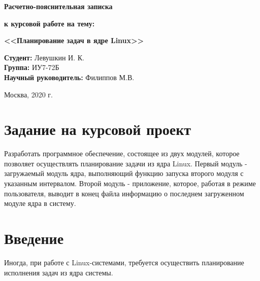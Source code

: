 \documentclass[a4paper,14pt]{extarticle}
\begin{document}
 	\vspace*{30mm}
 	
 	\LARGE
 	\begin{center}
 		\textbf{Расчетно-пояснительная записка}
 		
 		\textbf{к курсовой работе на тему:}
 		
 		\textbf{<<Планирование задач в ядре Linux>>}
 	\end{center}
 	
 	\vspace*{15mm}
 	
 	\large
 	\begin{flushleft}
 		\textbf{Студент:} Левушкин И. К. \\
 		\textbf{Группа:} ИУ7-72Б \\
 		\textbf{Научный руководитель:} Филиппов М.В.
 	\end{flushleft}
 	
 	\vspace*{50mm}
 	
 	\large
 	\begin{center}
 		Москва, 2020 г.
 	\end{center}
 	
 	\thispagestyle{empty}
 	
 	\newpage
 	
 	\section*{Задание на курсовой проект}
 	
 	Разработать программное обеспечение, состоящее из двух модулей, которое позволяет осуществлять планирование задачи из ядра Linux. Первый модуль - загружаемый модуль ядра, выполняющий функцию запуска второго модуля с указанным интервалом. Второй модуль - приложение, которое, работая в режиме пользователя, выводит в конец файла информацию о последнем загруженном модуле ядра в систему.
 	
 	\newpage
 	
 	\tableofcontents
 	\newpage
 	\section*{Введение}
 	
 	Иногда, при работе с Linux-системами, требуется осуществить планирование исполнения задач из ядра системы.
 	
\end{document}
